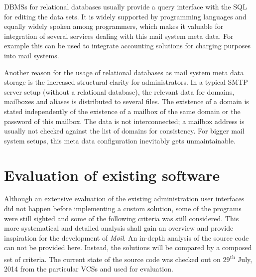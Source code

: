 \documentclass[12pt,a4paper]{scrartcl}
\begin{document}

		\acp{DBMS} for relational databases usually provide a query interface
		with the \ac{SQL} \cite{sql} for editing the data sets. It is widely
		supported by programming languages and equally widely spoken among
		programmers, which makes it valuable for integration of several
		services dealing with this mail system meta data. For example this can
		be used to integrate accounting solutions for charging purposes into
		mail systems.


		Another reason for the usage of relational databases as mail system
		meta data storage is the increased structural clarity for
		administrators. In a typical \acs{SMTP} \cite{smtp} server setup
		(without a relational database), the relevant data for domains,
		mailboxes and aliases is distributed to several files. The existence of
		a domain is stated independently of the existence of a mailbox of the
		same domain or the password of this mailbox. The data is not
		interconnected; a mailbox address is usually not checked against the
		list of domains for consistency. For bigger mail system setups, this
		meta data configuration inevitably gets unmaintainable.

	\section{Evaluation of existing software}

		Although an extensive evaluation of the existing administration user
		interfaces did not happen before implementing a custom solution, some
		of the programs were still sighted and some of the following criteria
		was still considered. This more systematical and detailed analysis
		shall gain an overview and provide inspiration for the development of
		\emph{Møil}. An in-depth analysis of the source code can not be
		provided here. Instead, the solutions will be compared by a composed
		set of criteria. The current state of the source code was checked out
		on 29\textsuperscript{th} July, 2014 from the particular \acp{VCS} and
		used for evaluation.
\end{document}
